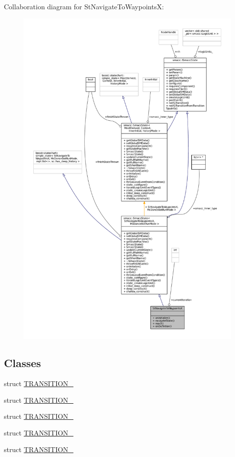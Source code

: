 Collaboration diagram for St\+Navigate\+To\+WaypointsX\+:
\nopagebreak
\begin{figure}[H]
\begin{center}
\leavevmode
\includegraphics[width=350pt]{structStNavigateToWaypointsX__coll__graph}
\end{center}
\end{figure}
\subsection*{Classes}
\begin{DoxyCompactItemize}
\item 
struct \hyperlink{structStNavigateToWaypointsX_1_1TRANSITION__1}{T\+R\+A\+N\+S\+I\+T\+I\+O\+N\+\_}
\item 
struct \hyperlink{structStNavigateToWaypointsX_1_1TRANSITION__2}{T\+R\+A\+N\+S\+I\+T\+I\+O\+N\+\_}
\item 
struct \hyperlink{structStNavigateToWaypointsX_1_1TRANSITION__3}{T\+R\+A\+N\+S\+I\+T\+I\+O\+N\+\_}
\item 
struct \hyperlink{structStNavigateToWaypointsX_1_1TRANSITION__4}{T\+R\+A\+N\+S\+I\+T\+I\+O\+N\+\_}
\item 
struct \hyperlink{structStNavigateToWaypointsX_1_1TRANSITION__5}{T\+R\+A\+N\+S\+I\+T\+I\+O\+N\+\_}
\end{DoxyCompactItemize}
